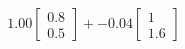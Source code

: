 \documentclass[preview]{standalone}
\begin{document}
\begin{align*}
1.00 \begin{bmatrix} 0.8 \\ 0.5 \end{bmatrix} + -0.04 \begin{bmatrix} 1 \\ 1.6 \end{bmatrix}
\end{align*}
\end{document}
